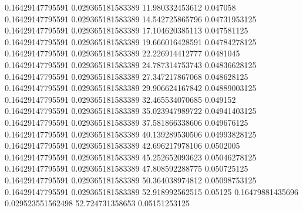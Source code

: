 0.16429147795591 0.029365181583389 11.980332453612 0.047058
0.16429147795591 0.029365181583389 14.542725865796 0.04731953125
0.16429147795591 0.029365181583389 17.104620385113 0.047581125
0.16429147795591 0.029365181583389 19.666016428591 0.04784278125
0.16429147795591 0.029365181583389 22.226914412777 0.0481045
0.16429147795591 0.029365181583389 24.787314753743 0.04836628125
0.16429147795591 0.029365181583389 27.347217867068 0.048628125
0.16429147795591 0.029365181583389 29.906624167842 0.04889003125
0.16429147795591 0.029365181583389 32.465534070685 0.049152
0.16429147795591 0.029365181583389 35.023947989722 0.04941403125
0.16429147795591 0.029365181583389 37.581866338606 0.049676125
0.16429147795591 0.029365181583389 40.139289530506 0.04993828125
0.16429147795591 0.029365181583389 42.696217978106 0.0502005
0.16429147795591 0.029365181583389 45.252652093623 0.05046278125
0.16429147795591 0.029365181583389 47.808592288775 0.050725125
0.16429147795591 0.029365181583389 50.364038974812 0.05098753125
0.16429147795591 0.029365181583389 52.918992562515 0.05125
0.16479881435696 0.029523551562498 52.724731358653 0.05151253125
